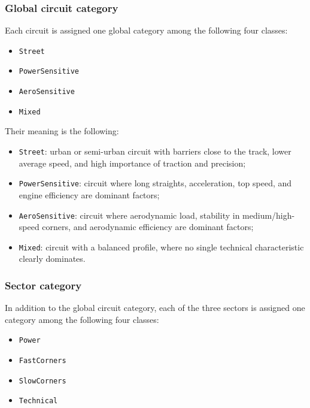 \documentclass[12pt,a4paper]{article}
\begin{document}
	
	\subsubsection*{Global circuit category}
	
	Each circuit is assigned one global category among the following four classes:
	\begin{itemize}
		\item \texttt{Street}
		\item \texttt{PowerSensitive}
		\item \texttt{AeroSensitive}
		\item \texttt{Mixed}
	\end{itemize}
	
	Their meaning is the following:
	\begin{itemize}
		\item \texttt{Street}: urban or semi-urban circuit with barriers close to the track, lower average speed, and high importance of traction and precision;
		
		\item \texttt{PowerSensitive}: circuit where long straights, acceleration, top speed, and engine efficiency are dominant factors;
		
		\item \texttt{AeroSensitive}: circuit where aerodynamic load, stability in medium/high-speed corners, and aerodynamic efficiency are dominant factors;
		
		\item \texttt{Mixed}: circuit with a balanced profile, where no single technical characteristic clearly dominates.
		
	\end{itemize}
	
	\subsubsection*{Sector category}
	
	In addition to the global circuit category, each of the three sectors is assigned one category among the following four classes:
	\begin{itemize}
		\item \texttt{Power}
		\item \texttt{FastCorners}
		\item \texttt{SlowCorners}
		\item \texttt{Technical}
	\end{itemize}
	
\end{document}
